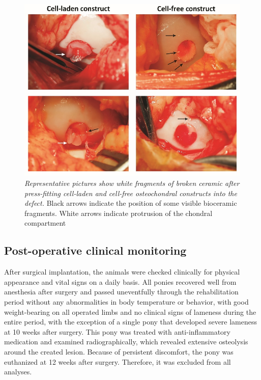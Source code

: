 \documentclass[twocolumn, serif, empirical, authordate, seplic]{jote-article}
\begin{document}
\begin{figure}
\centering \includegraphics[width=\columnwidth]{articles/empirical/horse/media/image5.jpg}
\caption{\emph{Representative pictures show white fragments of broken ceramic after press-fitting cell-laden and cell-free osteochondral constructs into the defect.} Black arrows indicate the position of some visible bioceramic fragments. White arrows indicate protrusion of the chondral compartment}
\label{fig:figure5}\end{figure}


 {}\subsection*{Post-operative clinical monitoring} 

After surgical implantation, the animals were checked clinically for physical appearance and vital signs on a daily basis. All ponies recovered well from anesthesia after surgery and passed uneventfully through the rehabilitation period without any abnormalities in body temperature or behavior, with good weight-bearing on all operated limbs and no clinical signs of lameness during the entire period, with the exception of a single pony that developed severe lameness at 10 weeks after surgery. This pony was treated with anti-inflammatory medication and examined radiographically, which revealed extensive osteolysis around the created lesion. Because of persistent discomfort, the pony was euthanized at 12 weeks after surgery. Therefore, it was excluded from all analyses.
\end{document}
